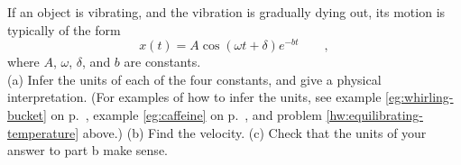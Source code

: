 If an object is vibrating, and the vibration is gradually dying out,
its motion is typically of the form
\begin{equation*}
  x(t) = A\cos(\omega t+\delta)e^{-bt} \qquad ,
\end{equation*}
where $A$, $\omega$, $\delta$, and $b$ are constants.\\
(a) Infer the units of each of the four constants, and give a physical interpretation.
(For examples of how to infer the units, see
example \ref{eg:whirling-bucket} on p.~\pageref{eg:whirling-bucket},
example \ref{eg:caffeine} on p.~\pageref{eg:caffeine},
and problem \ref{hw:equilibrating-temperature} above.)
\hwendpart
(b) Find the velocity.\hwendpart
(c) Check that the units of your answer to part b make sense.\answercheck\hwendpart
